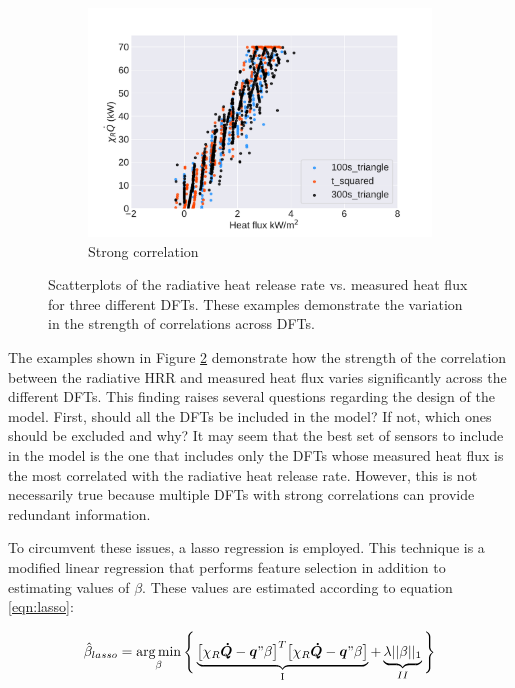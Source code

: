 \documentclass{article}
\begin{document}
\begin{figure}[htbp]
\begin{subfigure}[t]{.45\textwidth}
  \end{subfigure}
   \begin{subfigure}[t]{.45\textwidth}
      \centering
      \includegraphics[width=\textwidth ,keepaspectratio]{figures/strong_dft_scatter.pdf}
      \caption{Strong correlation}
      \label{fig:strong_scatter}
  \end{subfigure}
  \caption{Scatterplots of the radiative heat release rate vs. measured heat flux for three different DFTs. These examples demonstrate the variation in the strength of correlations across DFTs.} 
  \label{fig:dft_scatterplot}
\end{figure}

The examples shown in Figure \ref{fig:dft_scatterplot} demonstrate how the strength of the correlation between the radiative HRR and measured heat flux varies significantly across the different DFTs. This finding raises several questions regarding the design of the model. First, should all the DFTs be included in the model? If not, which ones should be excluded and why? It may seem that the best set of sensors to include in the model is the one that includes only the DFTs whose measured heat flux is the most correlated with the radiative heat release rate. However, this is not necessarily true because multiple DFTs with strong correlations can provide redundant information. 

To circumvent these issues, a lasso regression is employed. This technique is a modified linear regression that performs feature selection in addition to estimating values of $\beta$. These values are estimated according to equation \ref{eqn:lasso}:

 \begin{equation}
  \label{eqn:lasso}
  \hat\beta_{lasso} = \operatorname*{arg\,min}_{\beta}\Bigg\{ \underbrace{\big[\chi_R \boldsymbol{\dot{Q}} - \boldsymbol{q}" \beta\big]^T\big[\chi_R \boldsymbol{\dot{Q}} - \boldsymbol{q}" \beta\big]}_{\text{I}} + \underbrace{\lambda||\beta||_1}_{II}   \Bigg\}
\end{equation}
\end{document}
